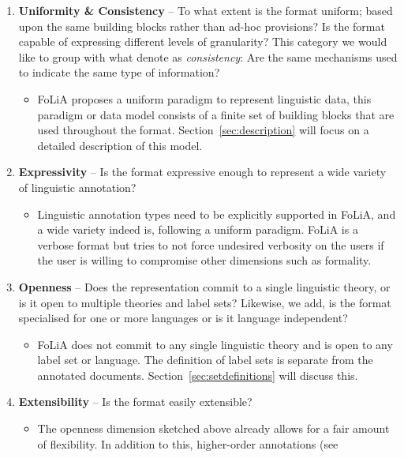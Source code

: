 \documentclass[a4paper,10pt,twoside]{article}
\begin{document}
\begin{enumerate}
\item \textbf{Uniformity \& Consistency} -- To what extent is the format
  uniform; based upon the same building blocks rather than ad-hoc provisions?
  Is the format capable of expressing different levels of granularity? This
  category we would like to group with what  denote as
  \emph{consistency}: Are the same mechanisms used to indicate the same type of
  information?
  \begin{itemize}
    \item[] FoLiA proposes a uniform paradigm to represent linguistic data, this
      paradigm or data model consists of a finite set of building blocks that
      are used throughout the format. Section~\ref{sec:description} will focus
      on a detailed description of this model.
  \end{itemize}
\item \textbf{Expressivity} -- Is the format expressive enough to represent a
  wide variety of linguistic annotation?
  \begin{itemize}
    \item[] Linguistic annotation types need to be explicitly supported in FoLiA,
      and a wide variety indeed is, following a uniform paradigm. FoLiA is a
      verbose format but tries to not force undesired verbosity on the users
      if the user is willing to compromise other dimensions such as formality.
  \end{itemize}
\item \textbf{Openness} -- Does the representation commit to a single linguistic
  theory, or is it open to multiple theories and label sets? Likewise, we add,
  is the format specialised for one or more languages or is it language
  independent?
  \begin{itemize}
    \item[] FoLiA does not commit to any single linguistic theory and is open to
      any label set or language. The definition of label sets is separate from
      the annotated documents. Section~\ref{sec:setdefinitions} will discuss
      this.
  \end{itemize}
\item \textbf{Extensibility} -- Is the format easily extensible?
  \begin{itemize}
    \item[] The openness dimension sketched above already allows for a fair
      amount of flexibility. In addition to this, higher-order annotations (see

\end{itemize}
\end{enumerate}
\end{document}
